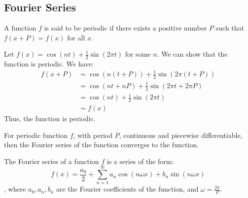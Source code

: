 \documentclass[11pt]{article}
\begin{document}
\subsection{Fourier Series}
\begin{definition}
    A function $f$ is said to be periodic if there exists a positive number $P$ such that $f(x+P) = f(x)$ for all $x$.
\end{definition}
\begin{example}
    Let $f(x) = \cos(nt) + \frac{1}2{\sin(2\pi t)}$ for some $n$. We can show that the function is periodic. We have:
    \begin{align*}
        f(x+P) &= \cos(n(t+P)) + \frac{1}{2}\sin(2\pi(t+P)) \\
        &= \cos(nt + nP) + \frac{1}{2}\sin(2\pi t + 2\pi P) \\
        &= \cos(nt) + \frac{1}{2}\sin(2\pi t) \\
        &= f(x)
    \end{align*}
    Thus, the function is periodic.
\end{example}
\begin{theorem}
    For periodic function $f$, with period $P$, continuous and piecewise differentiable, then the Fourier series of the function converges to the function.
\end{theorem}
\begin{definition}
    The Fourier series of a function $f$ is a series of the form:
    \begin{equation}
        f(x) = \frac{a_0}{2} + \sum_{n=1}^{\infty} a_n \cos(n\omega x) + b_n \sin(n \omega x)
    \end{equation}
    , where $a_0, a_n, b_n$ are the Fourier coefficients of the function, and $\omega = \frac{2\pi}{P}$.
\end{definition}
\end{document}
